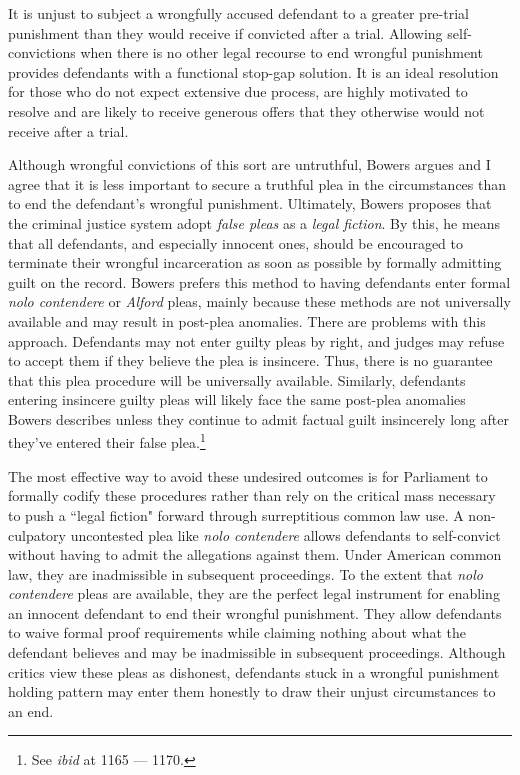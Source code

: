 It is unjust to subject a wrongfully accused defendant to a greater pre-trial punishment than they would receive if convicted after a trial. Allowing self-convictions when there is no other legal recourse to end wrongful punishment provides defendants with a functional stop-gap solution. It is an ideal resolution for those who do not expect extensive due process, are highly motivated to resolve and are likely to receive generous offers that they otherwise would not receive after a trial. 

Although wrongful convictions of this sort are untruthful, Bowers argues and I agree that it is less important to secure a truthful plea in the circumstances than to end the defendant's wrongful punishment. Ultimately, Bowers proposes that the criminal justice system adopt \textit{false pleas} as a \textit{legal fiction}. By this, he means that all defendants, and especially innocent ones, should be encouraged to terminate their wrongful incarceration as soon as possible by formally admitting guilt on the record. Bowers prefers this method to having defendants enter formal \textit{nolo contendere} or \textit{Alford} pleas, mainly because these methods are not universally available and may result in post-plea anomalies. There are problems with this approach. Defendants may not enter guilty pleas by right, and judges may refuse to accept them if they believe the plea is insincere. Thus, there is no guarantee that this plea procedure will be universally available. Similarly, defendants entering insincere guilty pleas will likely face the same post-plea anomalies Bowers describes unless they continue to admit factual guilt insincerely long after they've entered their false plea.\footnote{See \textit{ibid} at 1165 — 1170.} 

The most effective way to avoid these undesired outcomes is for Parliament to formally codify these procedures rather than rely on the critical mass necessary to push a ``legal fiction" forward through surreptitious common law use. A non-culpatory uncontested plea like \textit{nolo contendere} allows defendants to self-convict without having to admit the allegations against them. Under American common law, they are inadmissible in subsequent proceedings. To the extent that \textit{nolo contendere} pleas are available, they are the perfect legal instrument for enabling an innocent defendant to end their wrongful punishment. They allow defendants to waive formal proof requirements while claiming nothing about what the defendant believes and may be inadmissible in subsequent proceedings. Although critics view these pleas as dishonest, defendants stuck in a wrongful punishment holding pattern may enter them honestly to draw their unjust circumstances to an end.

